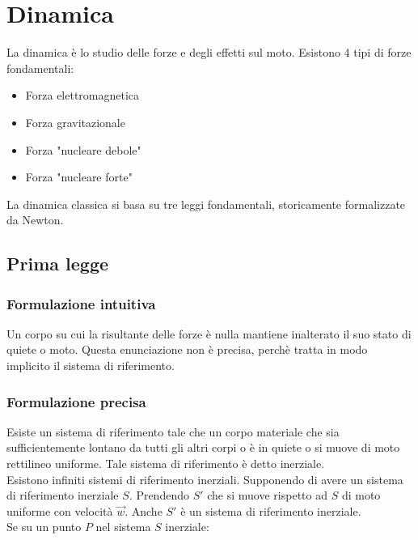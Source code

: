 \documentclass{article}
\begin{document}
\section{Dinamica}

La dinamica è lo studio delle forze e degli effetti sul moto.
Esistono 4 tipi di forze fondamentali:

\begin{itemize}
    \item Forza elettromagnetica
    \item Forza gravitazionale
    \item Forza "nucleare debole"
    \item Forza "nucleare forte"
\end{itemize}

\noindent
La dinamica classica si basa su tre leggi fondamentali, storicamente formalizzate da Newton.

\subsection{Prima legge}

\subsubsection{Formulazione intuitiva}

Un corpo su cui la risultante delle forze è nulla mantiene inalterato il suo stato di quiete o moto.
Questa enunciazione non è precisa, perchè tratta in modo implicito il sistema di riferimento.

\subsubsection{Formulazione precisa}

Esiste un sistema di riferimento tale che un corpo materiale che sia sufficientemente lontano da tutti gli altri corpi o è in quiete o si muove di moto rettilineo uniforme.
Tale sistema di riferimento è detto inerziale.\\

\noindent
Esistono infiniti sistemi di riferimento inerziali.
Supponendo di avere un sistema di riferimento inerziale $S$.
Prendendo $S'$ che si muove rispetto ad $S$ di moto uniforme con velocità $\vec{w}$.
Anche $S'$ è un sistema di riferimento inerziale.\\

\noindent
Se su un punto $P$ nel sistema $S$ inerziale:
\end{document}
